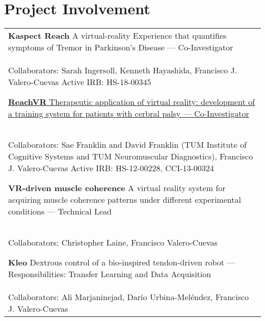 \documentclass[10pt,a4paper]{article}
\begin{document}
\vspace*{3mm}\section*{Project Involvement}


  \vspace*{1mm}
  \begin{tabularx}{17cm}{X}
  \textbf{Kaspect Reach} A virtual-reality Experience that quantifies symptoms of Tremor in Parkinson's Disease --- Co-Investigator\\
  Collaborators: Sarah Ingersoll, Kenneth Hayashida, Francisco J. Valero-Cuevas
  Active IRB: HS-18-00345


  \vspace*{3mm}
  \href{http://www.bacatec.de/en/gefoerderte_projekte.html}{\textbf{ReachVR} Therapeutic application of virtual reality: development of a training system for patients with cerbral palsy --- Co-Investigator}\\
  Collaborators: Sae Franklin and David Franklin (TUM Institute of Cognitive Systems and TUM Neuromuscular Diagnostics), Francisco J. Valero-Cuevas
  Active IRB: HS-12-00228, CCI-13-00324


  \vspace*{3mm}
  \textbf{VR-driven muscle coherence} A virtual reality system for acquiring muscle coherence patterns under different experimental conditions --- Technical Lead\\
  Collaborators: Christopher Laine, Francisco Valero-Cuevas




  \vspace*{3mm}
  \textbf{Kleo} Dextrous control of a bio-inspired tendon-driven robot --- Responsibilities: Transfer Learning and Data Acquisition\\
  Collaborators: Ali Marjaninejad, Dar\'{i}o Urbina-Mel\'{e}ndez, Francisco J. Valero-Cuevas


  \end{tabularx}
\end{document}
